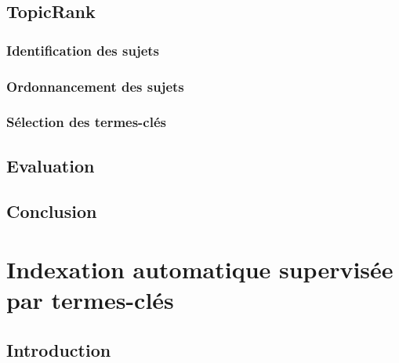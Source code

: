     \section{TopicRank}
    \label{sec:main-automatic_keyphrase_annotation-unsupervised_automatic_keyphrase_extraction-topicrank}
      \subsection{Identification des sujets}
      \label{sec:main-automatic_keyphrase_annotation-unsupervised_automatic_keyphrase_extraction-topicrank-topic_identification}

      \subsection{Ordonnancement des sujets}
      \label{sec:main-automatic_keyphrase_annotation-unsupervised_automatic_keyphrase_extraction-topicrank-topic_ranking}

      \subsection{Sélection des termes-clés}
      \label{sec:main-automatic_keyphrase_annotation-unsupervised_automatic_keyphrase_extraction-topicrank-keyphrase_selection}

    \section{Evaluation}
    \label{sec:main-automatic_keyphrase_annotation-unsupervised_automatic_keyphrase_extraction-evaluation}

    \section{Conclusion}
    \label{sec:main-automatic_keyphrase_annotation-unsupervised_automatic_keyphrase_extraction-conclusion}


  \chapter{Indexation automatique supervisée par termes-clés}
  \label{chap:main-automatic_keyphrase_annotation-supervised_automatic_keyphrase_extraction}
    \section{Introduction}
    \label{sec:main-automatic_keyphrase_annotation-supervised_automatic_keyphrase_annotation-introduction}

